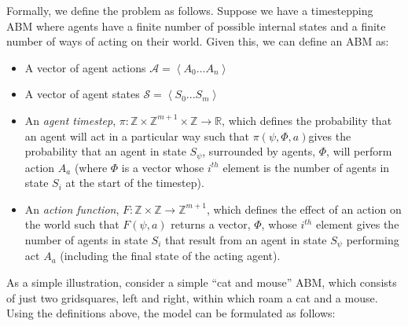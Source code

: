 \documentclass{article}
\begin{document}
Formally, we define the problem as follows.
Suppose we have a timestepping ABM where agents have a finite number of possible internal states and a finite number of ways of acting on their world. Given this, we can define an ABM as:
\begin{itemize}
	\item A vector of agent actions $\mathcal{A} =\left< A_0 ... A_n \right>$
	
	\item A vector of agent states $\mathcal{S} = \left<S_0 ... S_m\right>$
	
	\item An \textit{agent timestep}, $\pi : \mathbb{Z}\times\mathbb{Z}^{m+1}\times\mathbb{Z} \to \mathbb{R}$, which defines the probability that an agent will act in a particular way such that $\pi(\psi,\Phi,a) $gives the probability that an agent in state $S_\psi$, surrounded by agents, $\Phi$, will perform action $A_a$ (where $\Phi$ is a vector whose $i^{th}$ element is the number of agents in state $S_i$ at the start of the timestep).
	
	\item An \textit{action function}, $F: \mathbb{Z} \times \mathbb{Z} \to \mathbb{Z}^{m+1}$, which defines the effect of an action on the world such that $F(\psi, a)$ returns a vector, $\Phi$, whose $i^{th}$ element gives the number of agents in state $S_i$ that result from an agent in state $S_\psi$ performing act $A_a$ (including the final state of the acting agent).
\end{itemize}


As a simple illustration, consider a simple ``cat and mouse'' ABM, which consists of just two gridsquares, left and right, within which roam a cat and a mouse. Using the definitions above, the model can be formulated as follows: 
\end{document}
